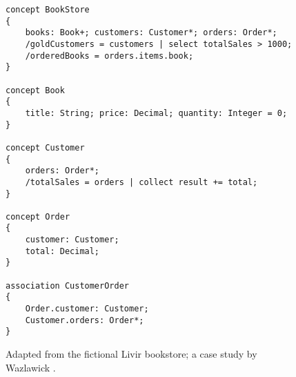 \begin{figure}
\verbatimfont{\scriptsize}
\begin{verbatim}
concept BookStore
{
    books: Book+; customers: Customer*; orders: Order*;
    /goldCustomers = customers | select totalSales > 1000;
    /orderedBooks = orders.items.book;
}

concept Book
{
    title: String; price: Decimal; quantity: Integer = 0;
}

concept Customer
{
    orders: Order*;
    /totalSales = orders | collect result += total;
}

concept Order
{
    customer: Customer;
    total: Decimal;
}

association CustomerOrder
{
    Order.customer: Customer;
    Customer.orders: Order*;
}
\end{verbatim}
\caption{Adapted from the fictional Livir bookstore; a case study by Wazlawick \cite{wazlawick}.}
\label{fig:store}
\end{figure}

